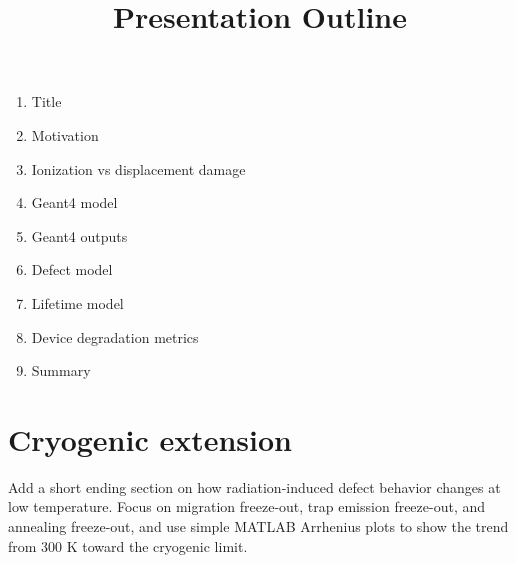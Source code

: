 \documentclass[11pt]{article}
\title{Presentation Outline}
\begin{document}
\maketitle

\begin{enumerate}
    \item Title
    \item Motivation
    \item Ionization vs displacement damage
    \item Geant4 model
    \item Geant4 outputs
    \item Defect model
    \item Lifetime model
    \item Device degradation metrics
    \item Summary
\end{enumerate}


\section*{Cryogenic extension}
Add a short ending section on how radiation-induced defect behavior changes at low temperature. Focus on migration freeze-out, trap emission freeze-out, and annealing freeze-out, and use simple MATLAB Arrhenius plots to show the trend from 300 K toward the cryogenic limit.
\end{document}
